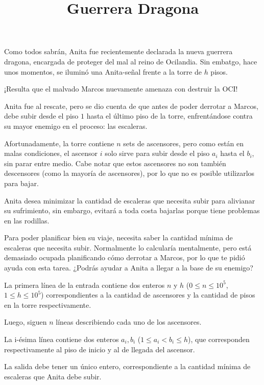 \documentclass{oci}
\title{Guerrera Dragona}
\begin{document}
\begin{problemDescription}
  Como todos sabrán, Anita fue recientemente
  declarada la nueva guerrera dragona, encargada
  de proteger del mal al reino de Ocilandia.
  Sin embatgo, hace unos momentos, se iluminó una
  Anita-señal frente a la torre de $h$ pisos.

  ¡Resulta que el malvado Marcos nuevamente amenaza
  con destruir la OCI!

  Anita fue al rescate, pero se dio cuenta de que
  antes de poder derrotar a Marcos, debe subir
  desde el piso $1$ hasta el último piso de la torre,
  enfrentándose contra su mayor enemigo en el proceso:
  las escaleras.

  Afortunadamente, la torre contiene $n$ sets de ascensores,
  pero como están en malas condiciones, el ascensor $i$
  solo sirve para subir desde el piso $a_i$ hasta el
  $b_i$, sin parar entre medio. Cabe notar que estos ascensores
  no son también descensores (como la mayoría de ascensores),
  por lo que no es posible utilizarlos para bajar.

  Anita desea minimizar la cantidad de escaleras que
  necesita subir para alivianar su sufrimiento, sin embargo,
  evitará a toda costa bajarlas porque tiene
  problemas en las rodillas.

  Para poder planificar bien su viaje, necesita saber la
  cantidad mínima de escaleras que necesita subir.
  Normalmente lo calcularía mentalmente, pero está demasiado
  ocupada planificando cómo derrotar a Marcos, por lo que
  te pidió ayuda con esta tarea. ¿Podrás ayudar a Anita
  a llegar a la base de su enemigo?
\end{problemDescription}

\begin{inputDescription}
  La primera línea de la entrada contiene dos enteros
  $n$ y $h$ ($0 \leq n \leq 10^5$, $1 \leq h \leq 10^5$)
  correspondientes a la cantidad de ascensores y la cantidad
  de pisos en la torre respectivamente.

  Luego, siguen $n$ líneas describiendo cada uno de los ascensores.

  La i-ésima línea contiene dos enteros $a_i, b_i$
  ($1 \leq a_i < b_i \leq h$), que corresponden respectivamente
  al piso de inicio y al de llegada del ascensor.
\end{inputDescription}

\begin{outputDescription}
  La salida debe tener un único entero, correspondiente a la cantidad
  mínima de escaleras que Anita debe subir.
\end{outputDescription}
\end{document}

